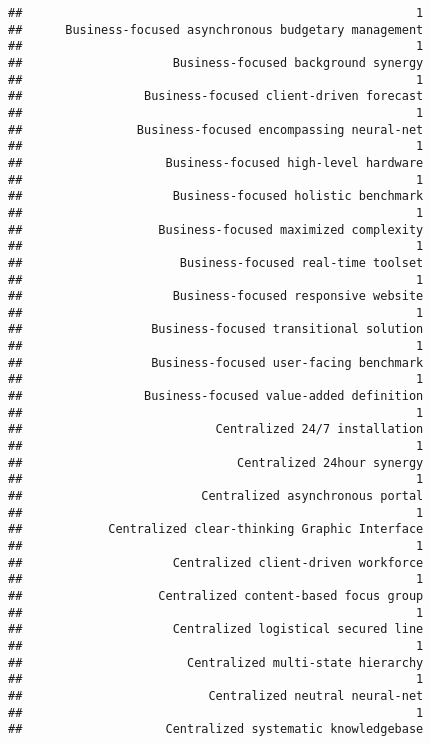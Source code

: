 \documentclass[
]{article}
\begin{document}
\begin{verbatim}
##                                                       1 
##      Business-focused asynchronous budgetary management 
##                                                       1 
##                     Business-focused background synergy 
##                                                       1 
##                 Business-focused client-driven forecast 
##                                                       1 
##                Business-focused encompassing neural-net 
##                                                       1 
##                    Business-focused high-level hardware 
##                                                       1 
##                     Business-focused holistic benchmark 
##                                                       1 
##                   Business-focused maximized complexity 
##                                                       1 
##                      Business-focused real-time toolset 
##                                                       1 
##                     Business-focused responsive website 
##                                                       1 
##                  Business-focused transitional solution 
##                                                       1 
##                  Business-focused user-facing benchmark 
##                                                       1 
##                 Business-focused value-added definition 
##                                                       1 
##                           Centralized 24/7 installation 
##                                                       1 
##                              Centralized 24hour synergy 
##                                                       1 
##                         Centralized asynchronous portal 
##                                                       1 
##            Centralized clear-thinking Graphic Interface 
##                                                       1 
##                     Centralized client-driven workforce 
##                                                       1 
##                   Centralized content-based focus group 
##                                                       1 
##                     Centralized logistical secured line 
##                                                       1 
##                       Centralized multi-state hierarchy 
##                                                       1 
##                          Centralized neutral neural-net 
##                                                       1 
##                    Centralized systematic knowledgebase 

\end{verbatim}
\end{document}
